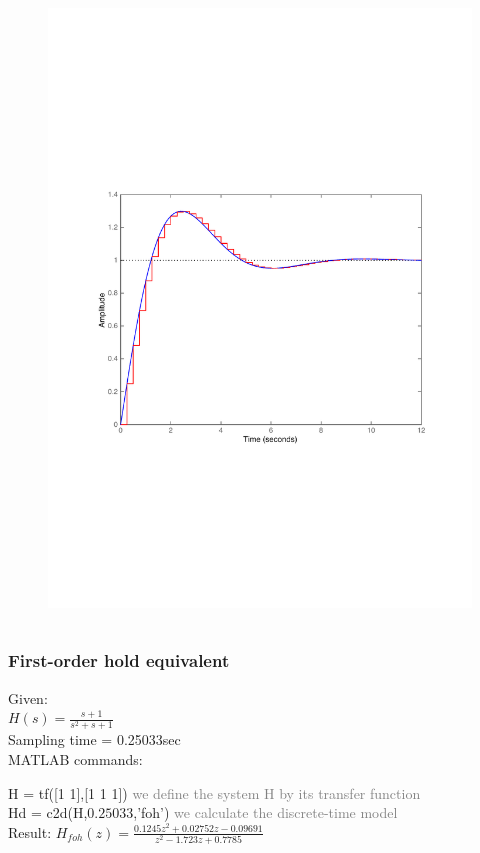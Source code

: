 \begin{frame}
\begin{columns}
\begin{column}{0.5\textwidth}
\begin{figure}
			\includegraphics[width=1\linewidth]{vb1}
		\end{figure}
		\end{column}
	\end{columns}
\end{frame}

\begin{frame}
	\frametitle{First-order hold equivalent}
	\begin{example}
		Given:\\
		$H(s) = \frac{s + 1}{s^{2} + s + 1}$\\
		Sampling time = 0.25033sec\\
		\vspace{1em}
		MATLAB commands:
	
		H = tf([1 1],[1 1 1])	\textcolor{gray}{we define the system H by its transfer function} \\
		Hd = c2d(H,$0.25033$,'foh')	\textcolor{gray}{we calculate the discrete-time model}\\
		\vspace{1em}
		Result:
		$H_{foh}(z) = \frac{0.1245z^{2} + 0.02752z - 0.09691}{z^{2} - 1.723z + 0.7785}$
	\end{example}
\end{frame}

